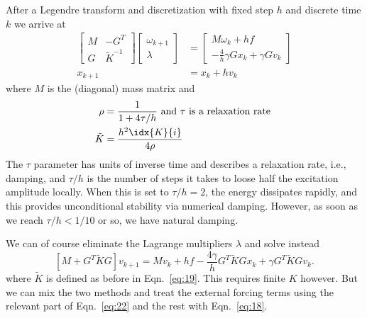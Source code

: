 \documentclass[10pt,notitlepage,abstracton]{scrartcl}
\theoremstyle{plain}
\theoremstyle{plain}
\theoremstyle{plain}
\begin{document}
After a Legendre transform and discretization with fixed step $h$ and
discrete time $k$ we arrive at 
\begin{equation}
  \label{eq:18}
  \begin{split}
    \begin{bmatrix}
      M & -G^{T} \\
      G & \tilde{K}^{-1}
    \end{bmatrix}
    \begin{bmatrix}
      \omega_{k+1} \\
      \lambda
    \end{bmatrix}
    &=
    \begin{bmatrix}
      M\omega_{k} + hf \\
      -\frac{4}{h}\gamma Gx_{k}  + \gamma Gv_{k}
    \end{bmatrix} \\
    x_{k+1} &= x_{k} + hv_{k}
  \end{split}
\end{equation}
where $M$ is the (diagonal) mass matrix and 
\begin{equation}
  \label{eq:19}
  \begin{split}
    \rho &= \frac{1}{1 + 4 \tau / h } \text{ and $\tau$ is a relaxation
      rate } \\
    \tilde{K} & = \frac{h^{2}\idx{K}{i}}{4\rho}
  \end{split}
\end{equation}
The $\tau$ parameter has units of inverse time and describes a relaxation
rate, i.e., damping, and $\tau/h$ is the number of steps it takes to loose
half the excitation amplitude locally.  When this is set to $\tau/h= 2$,
the energy dissipates rapidly, and this provides unconditional stability
via numerical damping.
However, as soon as we reach $\tau/h < 1/10$ or so, we have natural
damping.  

We can of course eliminate the Lagrange multipliers $\lambda$ and solve
instead 
\begin{equation}
  \label{eq:22}
  \left[ M + G^{T}\tilde{K}G \right]v_{k+1} = Mv_{k} + hf -
  \frac{4\gamma}{h}G^{T}\tilde{K}Gx_{k} + \gamma G^{T}\tilde{K}Gv_{k}. 
\end{equation}
where $\tilde{K}$ is defined as before in Eqn.~\eqref{eq:19}.  This
requires finite $K$ however.  But we can mix the two methods and treat the
external forcing terms using the relevant part of Eqn.~\eqref{eq:22} and
the rest with Eqn.~\eqref{eq:18}.  

\renewcommand{\arraystretch}{1.5}
\end{document}
